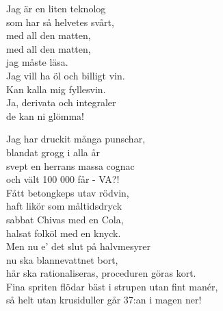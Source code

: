 \documentclass[a6paper, 10pt, twoside]{article}
\begin{document}
\begin{center}
\end{center}
\begin{lyrics}
Jag är en liten teknolog\\
som har så helvetes svårt,\\
med all den matten,\\
med all den matten,\\
jag måste läsa.
\vspace{5pt} \\
Jag vill ha öl och billigt vin.\\
Kan kalla mig fyllesvin.\\
Ja, derivata och integraler\\
de kan ni glömma!
\end{lyrics}
\vspace{-10pt}
\begin{center}
\end{center}
\begin{lyrics}
Jag har druckit många punschar,\\
blandat grogg i alla år\\
svept en herrans massa cognac\\
och vält 100 000 får - VA?!\\
Fått betongkeps utav rödvin,\\
haft likör som måltidsdryck\\
sabbat Chivas med en Cola, \\
halsat folköl med en knyck.
\vspace{5pt} \\
Men nu e' det slut på halvmesyrer\\
nu ska blannevattnet bort,\\
här ska rationaliseras, proceduren göras kort.\\
Fina spriten flödar bäst i strupen utan fint manér,\\
så helt utan krusiduller går 37:an i magen ner!
\end{lyrics}
\end{document}
